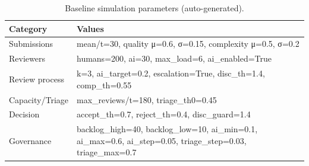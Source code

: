 \begin{table}[t]
\centering
\caption{Baseline simulation parameters (auto-generated).}
\label{tab:baseline_params}
\begin{tabular}{p{3.2cm} p{10.8cm}}
\hline
Category & Values \\
\hline
Submissions & mean/t=30, quality μ=0.6, σ=0.15, complexity μ=0.5, σ=0.2 \\
Reviewers & humans=200, ai=30, max\_load=6, ai\_enabled=True \\
Review process & k=3, ai\_target=0.2, escalation=True, disc\_th=1.4, comp\_th=0.55 \\
Capacity/Triage & max\_reviews/t=180, triage\_th0=0.45 \\
Decision & accept\_th=0.7, reject\_th=0.4, disc\_guard=1.4 \\
Governance & backlog\_high=40, backlog\_low=10, ai\_min=0.1, ai\_max=0.6, ai\_step=0.05, triage\_step=0.03, triage\_max=0.7 \\
\hline
\end{tabular}
\end{table}